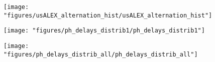

\author{Antonino Ingargiola}
\title{}


\verbatimfont{\small}

\maketitle

\begin{abstract}

\end{abstract}

\tableofcontents






\begin{figure}
\begin{center}
\texttt{[image: "figures/usALEX\_alternation\_hist/usALEX\_alternation\_hist"]}
\caption[]{}
\end{center}
\end{figure}





\begin{figure}
\begin{center}
\texttt{[image: "figures/ph\_delays\_distrib1/ph\_delays\_distrib1"]}
\caption[]{}
\end{center}
\end{figure}

\begin{figure}
\begin{center}
\texttt{[image: "figures/ph\_delays\_distrib\_all/ph\_delays\_distrib\_all"]}
\caption[]{}
\end{center}
\end{figure}

